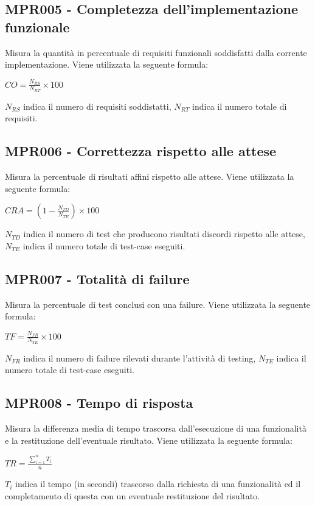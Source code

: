 \subsection{MPR005 - Completezza dell'implementazione funzionale}
Misura la quantità in percentuale di requisiti funzionali soddisfatti dalla corrente implementazione. Viene utilizzata la seguente formula: 
\begin{center}{$CO=\frac{N_{RS}}{N_{RT}}\times 100$}\end{center}
$N_{RS}$  indica il numero di requisiti soddistatti, $N_{RT}$  indica il numero totale di requisiti.

\subsection{MPR006 - Correttezza  rispetto alle attese}
Misura la percentuale di risultati affini rispetto alle attese. Viene utilizzata la seguente formula:
\begin{center}{$CRA=(1-\frac{N_{TD}}{N_{TE}})\times 100$}\end{center}
${N_{TD}}$ indica il numero di test che producono risultati discordi rispetto alle attese, ${N_{TE}}$ indica il numero totale di test-case eseguiti.

\subsection{MPR007 - Totalità di failure}
Misura la percentuale di test conclusi con una failure. Viene utilizzata la seguente formula:
\begin{center}{$TF=\frac{N_{FR}}{N_{TE}}\times 100$}\end{center}
${N_{FR}}$ indica il numero di failure rilevati durante l'attività di testing,
${N_{TE}}$ indica il numero totale di test-case eseguiti.

\subsection{MPR008 - Tempo di risposta}
Misura la differenza media di tempo trascorsa dall’esecuzione di una funzionalità e la restituzione
dell’eventuale risultato. Viene utilizzata la seguente formula:
\begin{center}{$TR=\frac{\sum\limits_{i=1}^n {T_i }}{n}$}\end{center}
${T_i}$ indica il tempo (in secondi) trascorso dalla richiesta di una funzionalità ed il completamento di questa con un eventuale restituzione del risultato.\\

